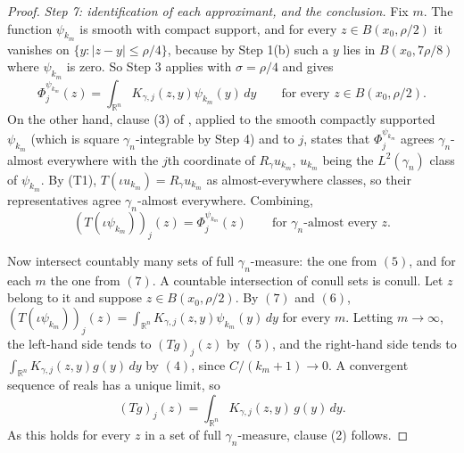 \begin{proof}
\emph{Step 7: identification of each approximant, and the conclusion.}
Fix $m$.  The function $\psi_{k_m}$ is smooth with compact support, and for
every $z \in B(x_0,\rho/2)$ it vanishes on $\{y : |z-y| \leq \rho/4\}$, because
by Step 1(b) such a $y$ lies in $B(x_0,7\rho/8)$ where $\psi_{k_m}$ is zero.  So
Step 3 applies with $\sigma = \rho/4$ and gives
\begin{equation*}
  \Phi_j^{\psi_{k_m}}(z)
    = \int_{\mathbb{R}^n}K_{\gamma,j}(z,y)\psi_{k_m}(y)\,dy
  \qquad\text{for every } z \in B(x_0,\rho/2) . \tag{6}
\end{equation*}
On the other hand, clause (3) of , applied to
the smooth compactly supported $\psi_{k_m}$ (which is square
$\gamma_n$-integrable by Step 4) and to $j$, states that
$\Phi_j^{\psi_{k_m}}$ agrees $\gamma_n$-almost everywhere with the $j$th
coordinate of $R_\gamma u_{k_m}$, $u_{k_m}$ being the $L^2(\gamma_n)$ class of
$\psi_{k_m}$.  By (T1), $T(\iota u_{k_m}) = R_\gamma u_{k_m}$ as
almost-everywhere classes, so their representatives agree $\gamma_n$-almost
everywhere.  Combining,
\begin{equation*}
  (T(\iota\psi_{k_m}))_j(z) = \Phi_j^{\psi_{k_m}}(z)
  \qquad\text{for } \gamma_n\text{-almost every } z . \tag{7}
\end{equation*}

Now intersect countably many sets of full $\gamma_n$-measure: the one from
$(5)$, and for each $m$ the one from $(7)$.  A countable intersection of
conull sets is conull.  Let $z$ belong to it and suppose
$z \in B(x_0,\rho/2)$.  By $(7)$ and $(6)$,
$(T(\iota\psi_{k_m}))_j(z) = \int_{\mathbb{R}^n}K_{\gamma,j}(z,y)\psi_{k_m}(y)\,dy$
for every $m$.  Letting $m \to \infty$, the left-hand side tends to $(Tg)_j(z)$
by $(5)$, and the right-hand side tends to
$\int_{\mathbb{R}^n}K_{\gamma,j}(z,y)g(y)\,dy$ by $(4)$, since
$C/(k_m+1) \to 0$.  A convergent sequence of reals has a unique limit, so
\[
  (Tg)_j(z) = \int_{\mathbb{R}^n}K_{\gamma,j}(z,y)\,g(y)\,dy .
\]
As this holds for every $z$ in a set of full $\gamma_n$-measure, clause (2)
follows.
\end{proof}
